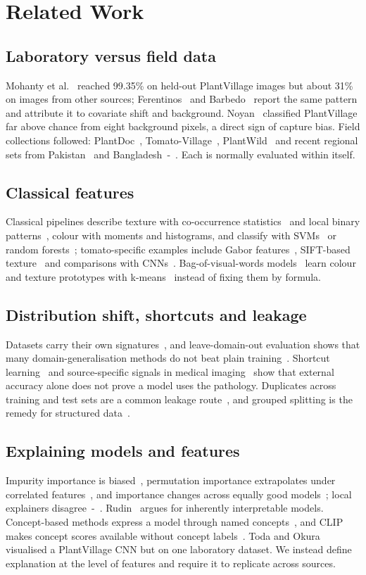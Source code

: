 \documentclass[conference]{IEEEtran}
\begin{document}
\section{Related Work}
\subsection{Laboratory versus field data}
Mohanty et al.~\cite{r2} reached 99.35\% on held-out PlantVillage images but about 31\% on images from other sources; Ferentinos~\cite{r3} and Barbedo~\cite{r4} report the same pattern and attribute it to covariate shift and background. Noyan~\cite{r5} classified PlantVillage far above chance from eight background pixels, a direct sign of capture bias. Field collections followed: PlantDoc~\cite{r6}, Tomato-Village~\cite{r7}, PlantWild~\cite{r8} and recent regional sets from Pakistan~\cite{r9} and Bangladesh~\cite{r10}-~\cite{r12}. Each is normally evaluated within itself.

\subsection{Classical features}
Classical pipelines describe texture with co-occurrence statistics~\cite{r14} and local binary patterns~\cite{r15}, colour with moments and histograms, and classify with SVMs~\cite{r16} or random forests~\cite{r17}; tomato-specific examples include Gabor features~\cite{r18}, SIFT-based texture~\cite{r19} and comparisons with CNNs~\cite{r20,r21}. Bag-of-visual-words models~\cite{r52,r53} learn colour and texture prototypes with k-means~\cite{r54,r55} instead of fixing them by formula.

\subsection{Distribution shift, shortcuts and leakage}
Datasets carry their own signatures~\cite{r23}, and leave-domain-out evaluation shows that many domain-generalisation methods do not beat plain training~\cite{r24,r25}. Shortcut learning~\cite{r29} and source-specific signals in medical imaging~\cite{r30,r31} show that external accuracy alone does not prove a model uses the pathology. Duplicates across training and test sets are a common leakage route~\cite{r32,r33}, and grouped splitting is the remedy for structured data~\cite{r34}.

\subsection{Explaining models and features}
Impurity importance is biased~\cite{r36}, permutation importance extrapolates under correlated features~\cite{r37}, and importance changes across equally good models~\cite{r38}; local explainers disagree~\cite{r39}-~\cite{r41}. Rudin~\cite{r42} argues for inherently interpretable models. Concept-based methods express a model through named concepts~\cite{r44,r45}, and CLIP~\cite{r46} makes concept scores available without concept labels~\cite{r47,r48}. Toda and Okura~\cite{r43} visualised a PlantVillage CNN but on one laboratory dataset. We instead define explanation at the level of features and require it to replicate across sources.
\end{document}

